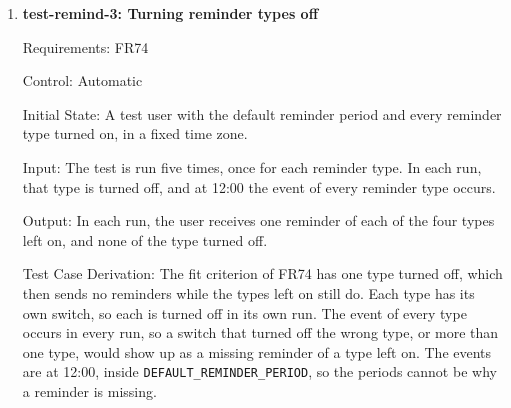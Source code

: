 \documentclass[12pt, titlepage]{article}
\begin{document}
\begin{enumerate}
Test Case Derivation: The fit criterion of FR73 has one user with chosen
periods and one without, so there are two users, and user 2's reminders
follow \texttt{DEFAULT\_REMINDER\_PERIOD} (9:00 to 20:00). User 1's first
period, and user 2's default period, are each tested at both ends, at the
boundary and one minute before it. A period includes its start but not its
end, so a request at 7:00 or 8:29 is delivered at once, while one at 6:59 or
8:30 is not. The request at 12:00 is between user 1's two periods, and the one
at 19:00 is at the end of the second period, so it is delivered the next day.
An event outside a period is delivered at the start of
the next period, since FR75 requires each event to produce one reminder within
the user's periods. Social reminders are used for the boundaries because a
friend request is still relevant whenever its reminder arrives, so the
expected time depends only on the periods. The other four types each have an
event at 12:00, which checks that every type follows the periods, not only
Social reminders. Their events are chosen so that they still hold at 18:00:
for example, the user records no activity that day, so the Activity reminder
is still due.

How test will be performed: A Jest test sets each user's periods, sets the
test clock to each time and causes each event, runs the clock to the end of
the next day, and records the type and time of every notification sent to the
test notification service.

\item{\textbf{test-remind-3: Turning reminder types off}\\}

Requirements: FR74

Control: Automatic

Initial State: A test user with the default reminder period and every
reminder type turned on, in a fixed time zone.

Input: The test is run five times, once for each reminder type. In each run,
that type is turned off, and at 12:00 the event of every reminder type occurs.

Output: In each run, the user receives one reminder of each of the four types
left on, and none of the type turned off.

Test Case Derivation: The fit criterion of FR74 has one type turned off,
which then sends no reminders while the types left on still do. Each type has
its own switch, so each is turned off in its own run. The event of every type
occurs in every run, so a switch that turned off the wrong type, or more than
one type, would show up as a missing reminder of a type left on. The events
are at 12:00, inside \texttt{DEFAULT\_REMINDER\_PERIOD}, so the periods
cannot be why a reminder is missing.


\end{enumerate}
\end{document}
